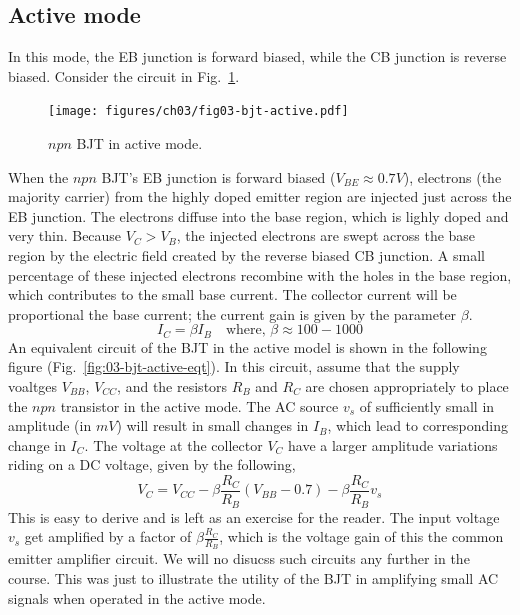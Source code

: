 \subsection{Active mode}
In this mode, the EB junction is forward biased, while the CB junction is reverse biased. Consider the circuit in Fig.~\ref{fig:03-bjt-active}.
\begin{figure}[h]
    \centering
    \texttt{[image: figures/ch03/fig03-bjt-active.pdf]}
    \caption{$npn$ BJT in active mode.}
    \label{fig:03-bjt-active}
\end{figure}
When the $npn$ BJT's EB junction is forward biased ($V_{BE} \approx 0.7V$), electrons (the majority carrier) from the highly doped emitter region are injected just across the EB junction. The electrons diffuse into the base region, which is lighly doped and very thin. Because $V_C > V_B$, the injected electrons are swept across the base region by the electric field created by the reverse biased CB junction. A small percentage of these injected electrons recombine with the holes in the base region, which contributes to the small base current. The collector current will be proportional the base current; the current gain is given by the parameter $\beta$.
\begin{equation}
    I_C = \beta I_B \quad \text{where, } \beta \approx 100 - 1000
    \label{eq:03-bjt-active-ic}
\end{equation}
An equivalent circuit of the BJT in the active model is shown in the following figure (Fig.~\ref{fig:03-bjt-active-eqt}). In this circuit, assume that the supply voaltges $V_{BB}$, $V_{CC}$, and the resistors $R_B$ and $R_C$ are chosen appropriately to place the $npn$ transistor in the active mode. The AC source $v_{s}$ of sufficiently small in amplitude (in $mV$) will result in small changes in $I_B$, which lead to corresponding change in $I_C$. The voltage at the collector $V_C$ have a larger amplitude variations riding on a DC voltage, given by the following,
\begin{equation}
    V_C = V_{CC} - \beta \frac{R_C}{R_B}\left(V_{BB} - 0.7 \right) -  \beta \frac{R_C}{R_B} v_s
    \label{eq:03-bjt-active-vc}
\end{equation}
This is easy to derive and is left as an exercise for the reader. The input voltage $v_s$ get amplified by a factor of $\beta \frac{R_C}{R_B}$, which is the voltage gain of this the common emitter amplifier circuit. We will no disucss such circuits any further in the course. This was just to illustrate the utility of the BJT in amplifying small AC signals when operated in the active mode.
